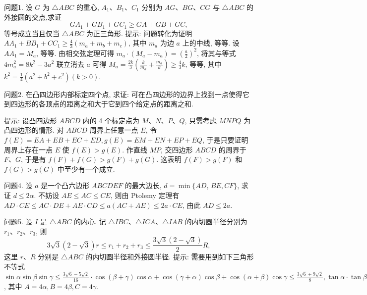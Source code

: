 
问题1. 设 $G$ 为 $\triangle A B C$ 的重心, $A_1 、 B_1 、 C_1$ 分别为 $A G 、 B G 、 C G$ 与 $\triangle A B C$ 的外接圆的交点,求证
$$
G A_1+G B_1+G C_1 \geqslant G A+G B+G C,
$$
等号成立当且仅当 $\triangle A B C$ 为正三角形.
提示: 问题转化为证明 $A A_1+B B_1+C C_1 \geqslant \frac{4}{3}\left(m_a+m_b+m_c\right)$, 其中 $m_a$ 为边 $a$ 上的中线, 等等.
设 $A A_1=M_a$, 等等.
由相交弦定理可得 $m_a \cdot\left(M_a-\right. \left.m_a\right)=\left(\frac{a}{2}\right)^2$, 将其与等式 $4 m_a^2=8 k^2-3 a^2$ 联立消去 $a$ 可得 $M_a= \frac{2 k}{3}\left(\frac{k}{m_a}+\frac{m_a}{k}\right) \geqslant \frac{4}{3} k$, 等等, 其中 $k^2=\frac{1}{4}\left(a^2+b^2+c^2\right)(k>0)$.



问题2. 在凸四边形内部标定四个点, 求证: 可在凸四边形的边界上找到一点使得它到四边形的各顶点的距离之和大于它到四个给定点的距离之和.
 
提示: 设凸四边形 $A B C D$ 内的 4 个标定点为 $M 、 N 、 P 、 Q$, 只需考虑 $M N P Q$ 为凸四边形的情形.
对 $A B C D$ 周界上任意一点 $E$, 令 $f(E)=E A+ E B+E C+E D, g(E)=E M+E N+E P+E Q$, 于是只要证明周界上存在一点 $E$ 使 $f(E)>g(E)$. 作直线 $M P$, 交四边形 $A B C D$ 的周界于 $F 、 G$, 于是有 $f(F)+f(G)>g(F)+g(G)$. 这表明 $f(F)>g(F)$ 和 $f(G)>g(G)$ 中至少有一个成立.



问题4. 设 $a$ 是一个凸六边形 $A B C D E F$ 的最大边长, $d=\min \{A D$, $B E, C F\}$, 求证 $d \leqslant 2 \alpha$.
不妨设 $A E \leqslant A C \leqslant C E$, 则由 Ptolemy 定理有 $A D \cdot C E \leqslant A C \cdot D E+ A E \cdot C D \leqslant a(A C+A E) \leqslant 2 a \cdot C E$, 由此 $A D \leqslant 2 a$.



问题5. 设 $I$ 是 $\triangle A B C$ 的内心.
记 $\triangle I B C 、 \triangle I C A 、 \triangle I A B$ 的内切圆半径分别为 $r_1 、 r_2 、 r_3$, 则
$$
3 \sqrt{3}(2-\sqrt{3}) r \leqslant r_1+r_2+r_3 \leqslant \frac{3 \sqrt{3}(2-\sqrt{3})}{2} R,
$$
这里 $r 、 R$ 分别是 $\triangle A B C$ 的内切圆半径和外接圆半径.
提示: 需要用到如下三角形不等式 $\sin \alpha \sin \beta \sin \gamma \leqslant \frac{3 \sqrt{6}-5 \sqrt{2}}{16} \cdot \cos (\beta+ \gamma) \cos \alpha+\cos (\gamma+\alpha) \cos \beta+\cos (\alpha+\beta) \cos \gamma \leqslant \frac{3 \sqrt{6}+9 \sqrt{2}}{8}, \tan \alpha \cdot \tan \beta+ \tan \beta \tan \gamma+\tan \gamma \tan \alpha \leqslant 3(7-4 \sqrt{3})$, 其中 $A=4 \alpha, B=4 \beta, C=4 \gamma$.


